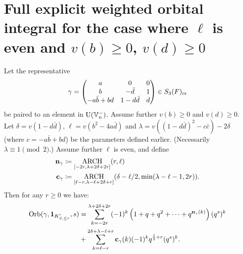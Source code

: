 \section{Full explicit weighted orbital integral for the case where $\ell$ is even and $v(b) \ge 0$, $v(d) \ge 0$}
\begin{theorem}
  \label{thm:full_orbital_ell_even}
  Let the representative
  \[ \gamma = \begin{pmatrix}
      a & 0 & 0 \\
      b & - \bar d & 1 \\
      -a \bar b + b d & 1 - d \bar d & d
    \end{pmatrix} \in S_3(F)_{\mathrm{rs}} \]
  be paired to an element in $\operatorname{U}(\mathbb V_n^-)$.
  Assume further $v(b) \ge 0$ and $v(d) \ge 0$.
  Let $\delta = v(1 - d \bar d)$, $\ell = v(b^2 - 4 a \bar d)$ and
  $\lambda = v((1 - d \bar d)^2 - c \bar c) - 2\delta$
  (where $c = -a \bar b + b d $) be the parameters defined earlier.
  (Necessarily $\lambda \equiv 1 \pmod 2$.)
  Assume further $\ell$ is even, and define
  \begin{align*}
    \mathbf n_\gamma &\coloneqq \operatorname*{ARCH}_{[-2r, \lambda + 2\delta + 2r]}(r, \ell) \\
    \mathbf c_\gamma &\coloneqq \operatorname*{ARCH}_{[\ell-r, \lambda - \ell + 2\delta + r]}
    (\delta - \ell/2, \min(\lambda-\ell-1, 2r)).
  \end{align*}
  Then for any $r \ge 0$ we have:
  \begin{align*}
    \operatorname{Orb}(\gamma, \mathbf{1}_{K'_{S, \le r}}, s)
    &= \sum_{k = -2r}^{\lambda + 2\delta +  2r}
    (-1)^k \left( 1 + q + q^2 + \dots + q^{\mathbf n_{\gamma}(k)}  \right) (q^s)^k \\
    &+ \sum_{k = \ell-r}^{2\delta + \lambda - \ell + r} \mathbf c_\gamma(k) (-1)^k q^{\frac{\ell}{2}+r} (q^s)^k.
  \end{align*}
\end{theorem}
